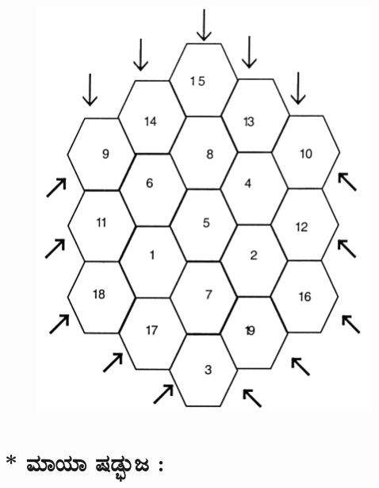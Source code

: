 \begin{figure}[H]
\includegraphics[scale=0.65]{src/figures/chap8/fig8.8.jpg}
\end{figure}


\section*{* ಮಾಯಾ ಷಡ್ಭುಜ :}

